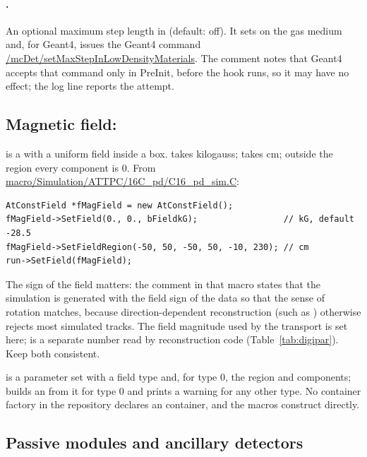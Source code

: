 \paragraph{.} An optional maximum step length in 
(default: off). It sets  on the gas medium and, for Geant4, issues the
Geant4 command \url{/mcDet/setMaxStepInLowDensityMaterials}. The comment notes that Geant4 accepts that command only
in PreInit, before the hook runs, so it may have no effect; the log line reports the attempt.

\subsection{Magnetic field: }

 is a  with a uniform field inside a box. 
takes kilogauss;  takes cm; outside the
region every component is 0. From \url{macro/Simulation/ATTPC/16C_pd/C16_pd_sim.C}:
\begin{verbatim}
AtConstField *fMagField = new AtConstField();
fMagField->SetField(0., 0., bFieldkG);                 // kG, default -28.5
fMagField->SetFieldRegion(-50, 50, -50, 50, -10, 230); // cm
run->SetField(fMagField);
\end{verbatim}
The sign of the field matters: the comment in that macro states that the simulation is generated with
the field sign of the data so that the sense of rotation matches, because direction-dependent
reconstruction (such as ) otherwise rejects most simulated tracks. The field
magnitude used by the transport is set here;  is a separate number read by
reconstruction code (Table~\ref{tab:digipar}). Keep both consistent.

 is a parameter set with a field type and, for type 0, the region and components;
 builds an  from it for type 0 and prints a warning for any
other type. No container factory in the repository declares an  container, and the
macros construct  directly.

\subsection{Passive modules and ancillary detectors}


